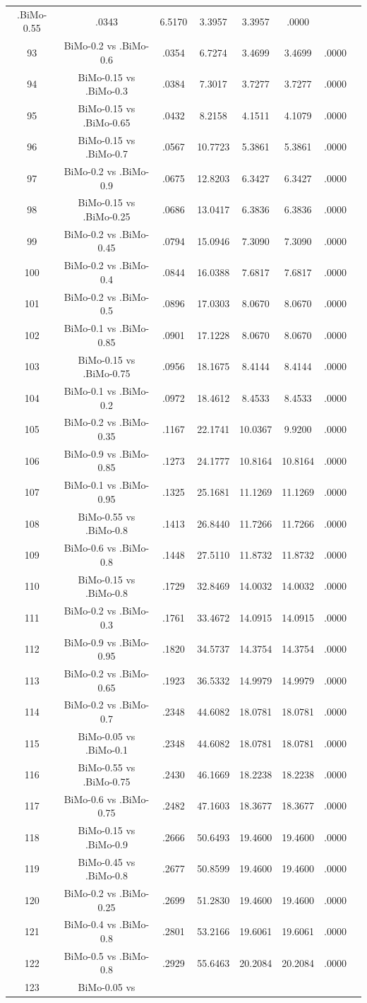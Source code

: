 \documentclass[a4paper,10pt]{article}
\begin{document}
\begin{landscape}
\begin{table}[!htp]
\begin{tabular}{cccccccc}
.BiMo-0.55&.0343&6.5170&3.3957&3.3957&.0000\\93&BiMo-0.2 vs .BiMo-0.6&.0354&6.7274&3.4699&3.4699&.0000\\94&BiMo-0.15 vs .BiMo-0.3&.0384&7.3017&3.7277&3.7277&.0000\\95&BiMo-0.15 vs .BiMo-0.65&.0432&8.2158&4.1511&4.1079&.0000\\96&BiMo-0.15 vs .BiMo-0.7&.0567&10.7723&5.3861&5.3861&.0000\\97&BiMo-0.2 vs .BiMo-0.9&.0675&12.8203&6.3427&6.3427&.0000\\98&BiMo-0.15 vs .BiMo-0.25&.0686&13.0417&6.3836&6.3836&.0000\\99&BiMo-0.2 vs .BiMo-0.45&.0794&15.0946&7.3090&7.3090&.0000\\100&BiMo-0.2 vs .BiMo-0.4&.0844&16.0388&7.6817&7.6817&.0000\\101&BiMo-0.2 vs .BiMo-0.5&.0896&17.0303&8.0670&8.0670&.0000\\102&BiMo-0.1 vs .BiMo-0.85&.0901&17.1228&8.0670&8.0670&.0000\\103&BiMo-0.15 vs .BiMo-0.75&.0956&18.1675&8.4144&8.4144&.0000\\104&BiMo-0.1 vs .BiMo-0.2&.0972&18.4612&8.4533&8.4533&.0000\\105&BiMo-0.2 vs .BiMo-0.35&.1167&22.1741&10.0367&9.9200&.0000\\106&BiMo-0.9 vs .BiMo-0.85&.1273&24.1777&10.8164&10.8164&.0000\\107&BiMo-0.1 vs .BiMo-0.95&.1325&25.1681&11.1269&11.1269&.0000\\108&BiMo-0.55 vs .BiMo-0.8&.1413&26.8440&11.7266&11.7266&.0000\\109&BiMo-0.6 vs .BiMo-0.8&.1448&27.5110&11.8732&11.8732&.0000\\110&BiMo-0.15 vs .BiMo-0.8&.1729&32.8469&14.0032&14.0032&.0000\\111&BiMo-0.2 vs .BiMo-0.3&.1761&33.4672&14.0915&14.0915&.0000\\112&BiMo-0.9 vs .BiMo-0.95&.1820&34.5737&14.3754&14.3754&.0000\\113&BiMo-0.2 vs .BiMo-0.65&.1923&36.5332&14.9979&14.9979&.0000\\114&BiMo-0.2 vs .BiMo-0.7&.2348&44.6082&18.0781&18.0781&.0000\\115&BiMo-0.05 vs .BiMo-0.1&.2348&44.6082&18.0781&18.0781&.0000\\116&BiMo-0.55 vs .BiMo-0.75&.2430&46.1669&18.2238&18.2238&.0000\\117&BiMo-0.6 vs .BiMo-0.75&.2482&47.1603&18.3677&18.3677&.0000\\118&BiMo-0.15 vs .BiMo-0.9&.2666&50.6493&19.4600&19.4600&.0000\\119&BiMo-0.45 vs .BiMo-0.8&.2677&50.8599&19.4600&19.4600&.0000\\120&BiMo-0.2 vs .BiMo-0.25&.2699&51.2830&19.4600&19.4600&.0000\\121&BiMo-0.4 vs .BiMo-0.8&.2801&53.2166&19.6061&19.6061&.0000\\122&BiMo-0.5 vs .BiMo-0.8&.2929&55.6463&20.2084&20.2084&.0000\\123&BiMo-0.05 vs 
\end{tabular}
\end{table}
\end{landscape}
\end{document}
